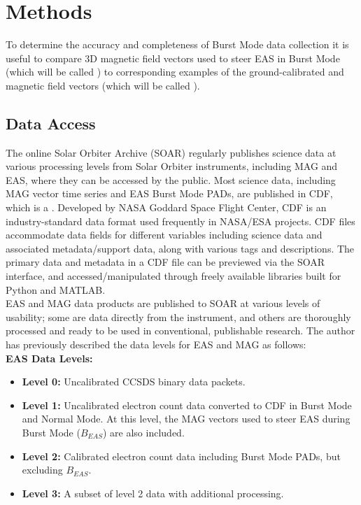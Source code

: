 \chapter{Methods}
\label{chapterlabel2}

To determine the accuracy and completeness of Burst Mode data collection it is useful to compare 3D magnetic field vectors used to steer EAS in Burst Mode (which will be called \q{\Beas}) to corresponding examples of the ground-calibrated and  magnetic field vectors (which will be called \q{\Bmag}).
\\

\section{Data Access} \label{data}
The online Solar Orbiter Archive (SOAR) regularly publishes science data at various processing levels from Solar Orbiter instruments, including MAG and EAS, where they can be accessed by the public\cite{soar}. Most science data, including MAG vector time series and EAS Burst Mode PADs, are published in CDF, which is a \cite{cdf}. Developed by NASA Goddard Space Flight Center, CDF is an industry-standard data format used frequently in NASA/ESA projects\cite{horbury2020}. CDF files accommodate data fields for different variables including science data and associated metadata/support data, along with various tags and descriptions. The primary data and metadata in a CDF file can be previewed via the SOAR interface, and accessed/manipulated through freely available libraries built for Python and MATLAB\cite{cdf}.
\\

EAS and MAG data products are published to SOAR at various levels of usability; some are  data directly from the instrument, and others are thoroughly processed and ready to be used in conventional, publishable research\cite{horbury2020}\cite{owen2020}\cite{zouganelis2020}. The author has previously described the data levels for EAS and MAG as follows\cite{dickson2024}:
\\

\textbf{EAS Data Levels\cite{owen2020}:}
\begin{itemize}
    \item \textbf{Level 0:} Uncalibrated CCSDS\cite{CCSDS_Standards_2022} binary data packets.
    \item \textbf{Level 1:} Uncalibrated electron count data converted to CDF in Burst Mode and Normal Mode. At this level, the MAG vectors used to steer EAS during Burst Mode (\(B_{EAS}\)) are also included.
    \item \textbf{Level 2:} Calibrated electron count data including Burst Mode PADs, but excluding \(B_{EAS}\).
    \item \textbf{Level 3:} A subset of level 2 data with additional processing.
\end{itemize}

